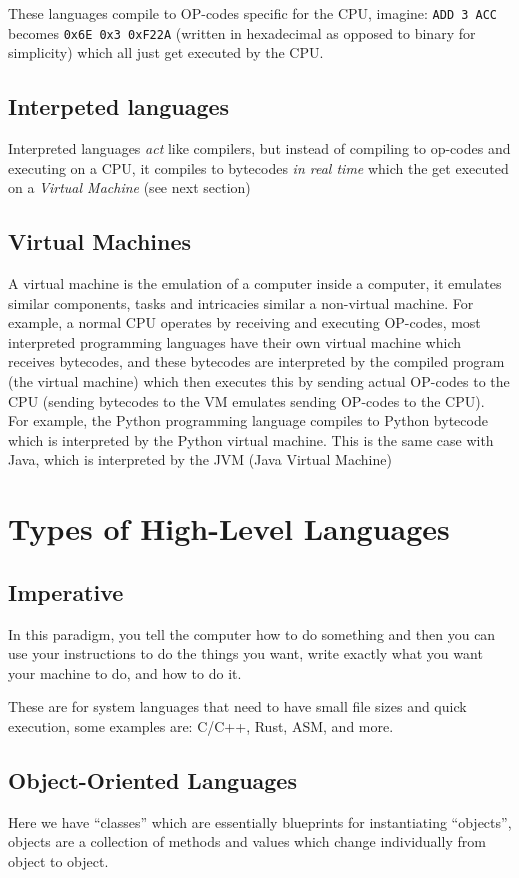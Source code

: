 \documentclass{article}
\newcommand{\code}[1]{\texttt{#1}}
\begin{document}
These languages compile to OP-codes specific for the CPU, imagine:
\code{ADD 3 ACC} becomes \code{0x6E 0x3 0xF22A} (written in hexadecimal as opposed to binary for simplicity) which all just get executed by the CPU.\\

\subsection{Interpeted languages}
Interpreted languages \emph{act} like compilers, but instead of compiling to op-codes and executing on a CPU, it compiles to bytecodes \emph{in real time} which the get executed on a \emph{Virtual Machine} (see next section)

\subsection{Virtual Machines}
A virtual machine is the emulation of a computer inside a computer, it emulates similar components, tasks and intricacies similar a non-virtual machine. For example, a normal CPU operates by receiving and executing OP-codes, most interpreted programming languages have their own virtual machine which receives bytecodes, and these bytecodes are interpreted by the compiled program (the virtual machine) which then executes this by sending actual OP-codes to the CPU (sending bytecodes to the VM emulates sending OP-codes to the CPU).\\

For example, the Python programming language compiles to Python bytecode which is interpreted by the Python virtual machine. This is the same case with Java, which is interpreted by the JVM (Java Virtual Machine) 


\section[High-level types]{Types of High-Level Languages}
\subsection{Imperative}
In this paradigm, you tell the computer how to do something and then you can use your instructions to do the things you want, write exactly what you want your machine to do, and how to do it.

These are for system languages that need to have small file sizes and quick execution, some examples are: C/C++, Rust, ASM, and more.
\subsection[OO Languages]{Object-Oriented Languages}
Here we have ``classes'' which are essentially blueprints for instantiating ``objects'', objects are a collection of methods and values which change individually from object to object.\\
\end{document}
